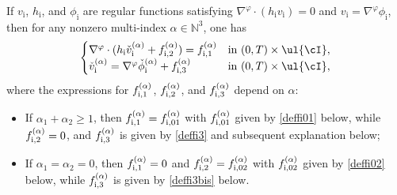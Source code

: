 \begin{proposition}\label{propGUinterior}
If $v_\mathrm{i}$, $h_\mathrm{i}$, and $\phi_\mathrm{i}$ are regular functions satisfying $\nabla^\varphi\cdot (h_\mathrm{i}v_\mathrm{i})=0$ and
$v_\mathrm{i}=\nabla^\varphi \phi_\mathrm{i}$, then for any nonzero multi-index $\alpha\in {\mathbb N}^3$, one has
\begin{equation}\label{QLSWEi}
\begin{cases}
\nabla^\varphi\cdot(h_\mathrm{i}\check{v}_\mathrm{i}^{(\alpha)}+f_{{\rm i},2}^{(\alpha)}) = f_{{\rm i},1}^{(\alpha)} &\text{in } (0,T)\times\ul{\cI}, \\
\check{v}_\mathrm{i}^{(\alpha)} = \nabla^\varphi \check{\phi}_\mathrm{i}^{(\alpha)}+f_{{\rm i},3}^{(\alpha)} &\text{in } (0,T)\times\ul{\cI},
\end{cases}
\end{equation}
where the expressions for $f_{{\rm i},1}^{(\alpha)}$, $f_{{\rm i},2}^{(\alpha)}$, and $f_{{\rm i},3}^{(\alpha)}$ depend on $\alpha$:
\begin{itemize}
\item
If $\alpha_1+\alpha_2\geq 1$,
then $f_{{\rm i},1}^{(\alpha)}=f_{{\rm i},01}^{(\alpha)} $ with $f_{{\rm i},01}^{(\alpha)} $ given by \eqref{deffi01} below,
while $f_{{\rm i},2}^{(\alpha)}=0$, and $f_{{\rm i},3}^{(\alpha)}$ is given by \eqref{deffi3} and subsequent explanation below;
\item
If $\alpha_1=\alpha_2=0$,
then $f_{{\rm i},1}^{(\alpha)}=0 $ and $f_{{\rm i},2}^{(\alpha)}=f_{{\rm i},02}^{(\alpha)} $ with $f_{{\rm i},02}^{(\alpha)} $ given by \eqref{deffi02} below,
while $f_{{\rm i},3}^{(\alpha)}$ is given by \eqref{deffi3bis} below.
\end{itemize}
\end{proposition}

